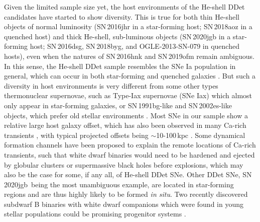 \documentclass[twocolumn]{aastex631}
\newcommand{\sn}{SN\,2020jgb}
\begin{document}
Given the limited sample size yet, the host environments of the He-shell DDet candidates have started to show diversity. This is true for both thin He-shell objects of normal luminosity (SN\,2016jhr in a star-forming host; SN\,2018aoz in a quenched host) and thick He-shell, sub-luminous objects (SN\,2020jgb in a star-forming host; SN\,2016dsg, SN\,2018byg, and OGLE-2013-SN-079 in quenched hosts), even when the natures of SN\,2016hnk and SN\,2019ofm remain ambiguous. In this sense, the He-shell DDet sample resembles the SNe Ia population in general, which can occur in both star-forming and quenched galaxies \citep[e.g.,][]{Sullivan_2006, Smith_2012}. But such a diversity in host environments is very different from some other types thermonuclear supernovae, such as Type-Iax supernovae (SNe Iax) which almost only appear in star-forming galaxies, or SN\,1991bg-like and SN\,2002es-like objects, which prefer old stellar environments \citep[see the review in][]{Jha_2019}. Most SNe in our sample show a relative large host galaxy offset, which has also been observed in many Ca-rich transients \citep{Lunnan_2017}, with typical projected offsets being $\sim$10-100\,kpc \citep{de_Ca_rich_2020}. Some dynamical formation channels have been proposed to explain the remote locations of Ca-rich transients, such that white dwarf binaries would need to be hardened and ejected by globular clusters \citep{Shen_2019} or supermassive black holes \citep{Foley_2015} before explosions, which may also be the case for some, if any all, of He-shell DDet SNe. Other DDet SNe, \sn\ being the most unambiguous example, are located in star-forming regions and are thus highly likely to be formed {\it in situ}. Two recently discovered subdwarf B binaries with white dwarf companions which were found in young stellar populations could be promising progenitor systems \citep{Geier_2013, Kupfer_2022}.
\end{document}
